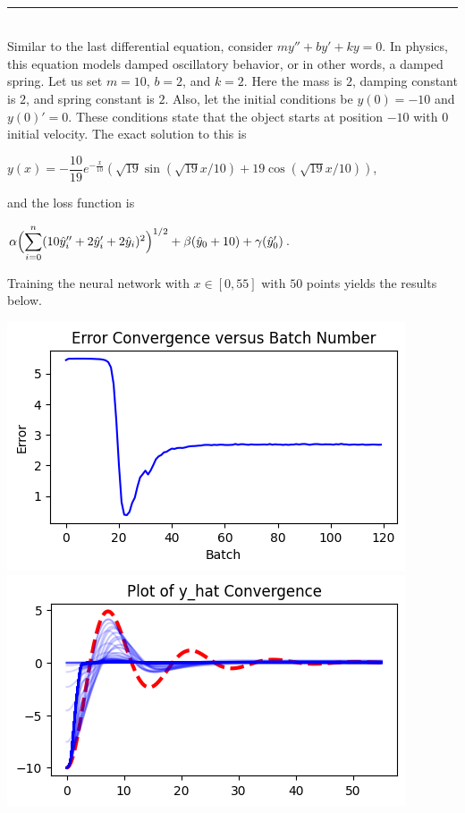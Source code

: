\documentclass[12pt]{article}
\newcommand{\dsum}[2]{\mathlarger{\sum}_{#1}^{#2}}
\newcommand{\bgc}{\begin{center}}
\newcommand{\enc}{\end{center}}
\begin{document}
\begin{description}
\begin{minipage}{\linewidth}
    \end{minipage}
    \hfill \\
    \noindent\rule{15.5cm}{.4pt}
    \hfill \\
    Similar to the last differential equation, consider $my'' + by' + ky = 0$.
    In physics, this equation models damped oscillatory behavior, or in other
    words, a damped spring. Let us set $m = 10$, $b = 2$, and $k = 2$. Here the
    mass is $2$, damping constant is $2$, and spring constant is $2$.  Also,
    let the initial conditions be $y(0) = -10$ and $y(0)' = 0$. These
    conditions state that the object starts at position $-10$ with $0$ initial
    velocity. The exact solution to this is 
    \bgc 
    $y(x) = -\dfrac{10}{19} e^{-\frac{x}{10}} (\sqrt{19}\sin(\sqrt{19}x/10) + 19\cos(\sqrt{19}x/10))$,
    \enc
    and the loss function is 
    \bgc 
    $\alpha\Bigl(\dsum{i=0}{n}(10\hat{y}_i'' + 2\hat{y}_i' + 2\hat{y}_i)^2\Bigr)^{1/2} 
    + \beta(\hat{y}_0 + 10)
    + \gamma(\hat{y}_0')$.
    \enc
    Training the neural network with $x\in[0, 55]$ with $50$ points yields the
    results below. \\ 
    \begin{minipage}{\linewidth}
        \centering
        \includegraphics[scale=.5]{images/figure13.png}
        \includegraphics[scale=.5]{images/figure14.png}

\end{minipage}
\end{description}
\end{document}

